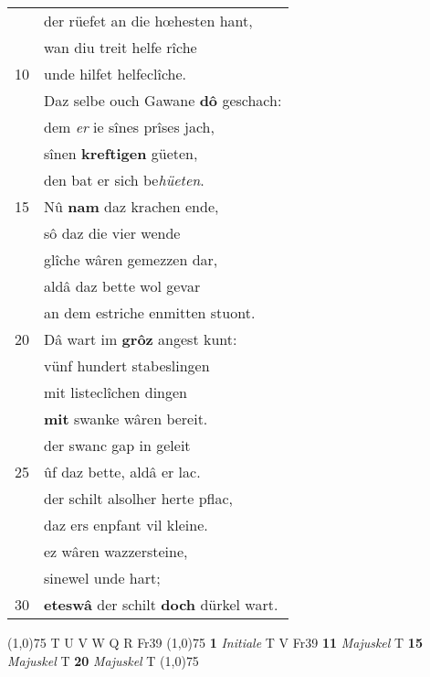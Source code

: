 \documentclass[8pt,a4paper,notitlepage]{article}
\begin{document}
\begin{table}[ht]
\begin{minipage}[t]{0.5\linewidth}
\begin{tabular}{rl}
 & der rüefet an die hœhesten hant,\\ 
 & wan diu treit helfe rîche\\ 
10 & unde hilfet helfeclîche.\\ 
 & Daz selbe ouch Gawane \textbf{dô} geschach:\\ 
 & dem \textit{er} ie sînes prîses jach,\\ 
 & sînen \textbf{kreftigen} güeten,\\ 
 & den bat er sich be\textit{hüeten}.\\ 
15 & Nû \textbf{nam} daz krachen ende,\\ 
 & sô daz die vier wende\\ 
 & glîche wâren gemezzen dar,\\ 
 & aldâ daz bette wol gevar\\ 
 & an dem estriche enmitten stuont.\\ 
20 & Dâ wart im \textbf{grôz} angest kunt:\\ 
 & vünf hundert stabeslingen\\ 
 & mit listeclîchen dingen\\ 
 & \textbf{mit} swanke wâren bereit.\\ 
 & der swanc gap in geleit\\ 
25 & ûf daz bette, aldâ er lac.\\ 
 & der schilt alsolher herte pflac,\\ 
 & daz ers enpfant vil kleine.\\ 
 & ez wâren wazzersteine,\\ 
 & sinewel unde hart;\\ 
30 & \textbf{eteswâ} der schilt \textbf{doch} dürkel wart.\\ 
\end{tabular}
\scriptsize
\line(1,0){75} \newline
T U V W Q R Fr39 \newline
\line(1,0){75} \newline
\textbf{1} \textit{Initiale} T V Fr39  \textbf{11} \textit{Majuskel} T  \textbf{15} \textit{Majuskel} T  \textbf{20} \textit{Majuskel} T  \newline
\line(1,0){75} \newline

\end{minipage}
\end{table}
\end{document}
